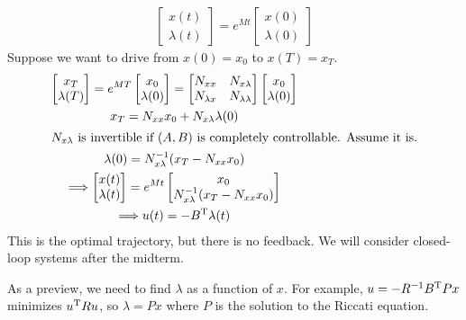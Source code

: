 \begin{gather}
  \begin{bmatrix}
    x(t) \\ \lambda(t)
  \end{bmatrix} =
  e^{Mt}
  \begin{bmatrix}
    x(0) \\ \lambda(0)
  \end{bmatrix}
\end{gather}
Suppose we want to drive from $x(0)=x_0$ to $x(T)=x_T$.
\begin{gather}
  \begin{bmatrix}
    x_T \\ \lambda(T)
  \end{bmatrix} =
  e^{MT}
  \begin{bmatrix}
    x_0 \\ \lambda(0)
  \end{bmatrix} =
  \begin{bmatrix}
    N_{xx} & N_{x\lambda} \\
    N_{\lambda x} & N_{\lambda\lambda}
  \end{bmatrix}
  \begin{bmatrix}
    x_0 \\ \lambda(0)
  \end{bmatrix} \\
  x_T = N_{xx} x_0 + N_{x\lambda} \lambda(0) \\
  \intertext{$N_{x\lambda}$ is invertible if $(A,B)$ is completely controllable. Assume it is.}
  \lambda(0) = N_{x\lambda}^{-1} (x_T - N_{xx} x_0) \\
  \Longrightarrow
  \begin{bmatrix}
    x(t) \\ \lambda(t)
  \end{bmatrix} =
  e^{Mt}
  \begin{bmatrix}
    x_0 \\
    N_{x\lambda}^{-1} (x_T - N_{xx} x_0)
  \end{bmatrix} \\
  \Longrightarrow u(t) = -B^\text{T} \lambda(t)
\end{gather}
This is the optimal trajectory, but there is no feedback. We will consider closed-loop systems after the midterm.

As a preview, we need to find $\lambda$ as a function of $x$. For example, $u=-R^{-1} B^\text{T} Px$ minimizes $u^\text{T} Ru$, so $\lambda=Px$ where $P$ is the solution to the Riccati equation.

